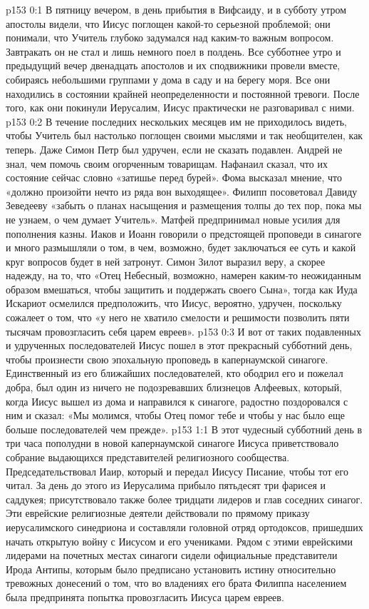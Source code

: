 \author{Комиссия срединников}
\vs p153 0:1 В пятницу вечером, в день прибытия в Вифсаиду, и в субботу утром апостолы видели, что Иисус поглощен какой\hyp{}то серьезной проблемой; они понимали, что Учитель глубоко задумался над каким\hyp{}то важным вопросом. Завтракать он не стал и лишь немного поел в полдень. Все субботнее утро и предыдущий вечер двенадцать апостолов и их сподвижники провели вместе, собираясь небольшими группами у дома в саду и на берегу моря. Все они находились в состоянии крайней неопределенности и постоянной тревоги. После того, как они покинули Иерусалим, Иисус практически не разговаривал с ними.
\vs p153 0:2 В течение последних нескольких месяцев им не приходилось видеть, чтобы Учитель был настолько поглощен своими мыслями и так необщителен, как теперь. Даже Симон Петр был удручен, если не сказать подавлен. Андрей не знал, чем помочь своим огорченным товарищам. Нафанаил сказал, что их состояние сейчас словно «затишье перед бурей». Фома высказал мнение, что «должно произойти нечто из ряда вон выходящее». Филипп посоветовал Давиду Зеведееву «забыть о планах насыщения и размещения толпы до тех пор, пока мы не узнаем, о чем думает Учитель». Матфей предпринимал новые усилия для пополнения казны. Иаков и Иоанн говорили о предстоящей проповеди в синагоге и много размышляли о том, в чем, возможно, будет заключаться ее суть и какой круг вопросов будет в ней затронут. Симон Зилот выразил веру, а скорее надежду, на то, что «Отец Небесный, возможно, намерен каким\hyp{}то неожиданным образом вмешаться, чтобы защитить и поддержать своего Сына», тогда как Иуда Искариот осмелился предположить, что Иисус, вероятно, удручен, поскольку сожалеет о том, что «у него не хватило смелости и решимости позволить пяти тысячам провозгласить себя царем евреев».
\vs p153 0:3 И вот от таких подавленных и удрученных последователей Иисус пошел в этот прекрасный субботний день, чтобы произнести свою эпохальную проповедь в капернаумской синагоге. Единственный из его ближайших последователей, кто ободрил его и пожелал добра, был один из ничего не подозревавших близнецов Алфеевых, который, когда Иисус вышел из дома и направился к синагоге, радостно поздоровался с ним и сказал: «Мы молимся, чтобы Отец помог тебе и чтобы у нас было еще больше последователей чем прежде».
\vs p153 1:1 В этот чудесный субботний день в три часа пополудни в новой капернаумской синагоге Иисуса приветствовало собрание выдающихся представителей религиозного сообщества. Председательствовал Иаир, который и передал Иисусу Писание, чтобы тот его читал. За день до этого из Иерусалима прибыло пятьдесят три фарисея и саддукея; присутствовало также более тридцати лидеров и глав соседних синагог. Эти еврейские религиозные деятели действовали по прямому приказу иерусалимского синедриона и составляли головной отряд ортодоксов, пришедших начать открытую войну с Иисусом и его учениками. Рядом с этими еврейскими лидерами на почетных местах синагоги сидели официальные представители Ирода Антипы, которым было предписано установить истину относительно тревожных донесений о том, что во владениях его брата Филиппа населением была предпринята попытка провозгласить Иисуса царем евреев.
